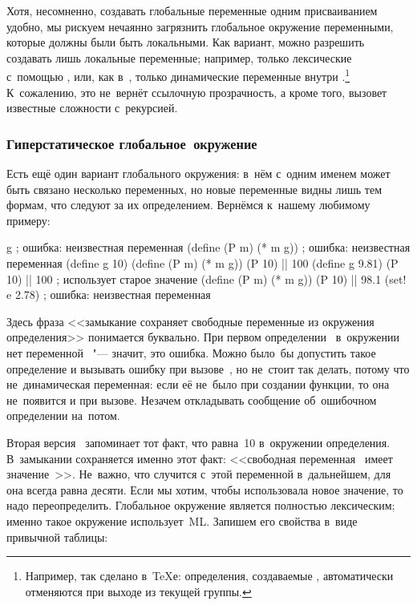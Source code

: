 Хотя, несомненно, создавать глобальные переменные одним присваиванием удобно,
мы рискуем нечаянно загрязнить глобальное окружение переменными, которые должны
были быть локальными. Как вариант, можно разрешить создавать лишь локальные
переменные; например, только лексические с~помощью , или, как
в~\cite{nor72}, только динамические переменные внутри .\footnote*{%
Например, так сделано в~{\TeX}е: определения, создаваемые ,
автоматически отменяются при выходе из текущей группы.} К~сожалению, это
не~вернёт ссылочную прозрачность, а кроме того, вызовет известные сложности
с~рекурсией.


\subsubsection{Гиперстатическое глобальное~окружение}%
\label{assignment/assignment/free-vars/sssect:hyperstatic}

Есть ещё один вариант глобального окружения: в~нём с~одним именем может быть
связано несколько переменных, но новые переменные видны лишь тем формам, что
следуют за их определением. Вернёмся к~нашему любимому примеру:

\begin{code:lisp}
g                      ; ошибка: неизвестная переменная 
(define (P m) (* m g)) ; ошибка: неизвестная переменная 
(define g 10)
(define (P m) (* m g))
(P 10)       |\is| 100
(define g 9.81)
(P 10)       |\is| 100    ;  использует старое значение 
(define (P m) (* m g))
(P 10)       |\is| 98.1
(set! e 2.78)          ; ошибка: неизвестная переменная 
\end{code:lisp}

Здесь фраза <<замыкание сохраняет свободные переменные из окружения
определения>> понимается буквально. При первом определении~ в~окружении
нет переменной~ "--- значит, это ошибка. Можно было~бы допустить такое
определение и вызывать ошибку при вызове~, но не~стоит так делать, потому
что  не~динамическая переменная: если её не~было при создании функции, то
она не~появится и при вызове. Незачем откладывать сообщение об~ошибочном
определении на~потом.

Вторая версия~ запоминает тот факт, что  равна~10 в~окружении
определения. В~замыкании сохраняется именно этот факт: <<свободная
переменная~ имеет значение~>>. Не~важно, что случится с~этой
переменной в~дальнейшем, для~ она всегда равна десяти. Если мы хотим,
чтобы  использовала новое значение, то  надо переопределить.
Глобальное окружение является полностью лексическим; именно такое
 окружение использует~ML. Запишем его свойства в~виде
привычной таблицы:

